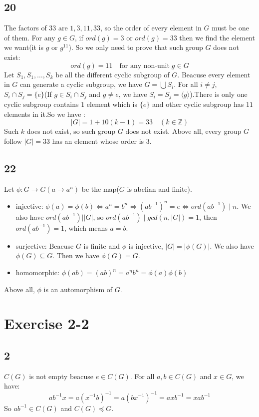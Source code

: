 \documentclass[draft]{article}
\begin{document}
		\subsection*{20}
			The factors of $33$ are $1, 3, 11, 33$, so the order of every element in
			$G$ must be one of them. For any $g \in G$, if $ord(g) = 3$ or $ord(g) =
			33$ then we find the element we want(it is $g$ or $g^{11}$). So we only 
			need to prove that such group $G$ does not exist:
			$$
				ord(g) = 11 \quad \text{for any non-unit} \; g \in G 
			$$
			Let $S_1, S_1, \dots, S_k$ be all the different cyclic subgroup of $G$.
			Beacuse every element in $G$ can generate a cyclic subgroup, we have $G =
			\bigcup S_i$.  For all $i \neq j$, $S_i \cap S_j = \{e\}$(If $g \in S_i \cap S_j$ and $g
			\neq e$, we have $S_i = S_j = \langle g \rangle$).There is only one cyclic
			subgroup contains $1$ element which is $\{e\}$ and other cyclic subgroup has
			$11$ elements in it.So we have :
			$$
			\vert G \vert = 1 + 10(k - 1) = 33 \quad (k \in \mathbb{Z})
			$$
			Such $k$ does not exist, so such group $G$ does not exist.
			Above all, every group $G$ follow $\vert G \vert = 33$ has an element whose
			order is $3$.
		\subsection*{22}
			Let $\phi:G \rightarrow G(a \rightarrow a^n)$ be the map($G$ is abelian
			and finite).
			\begin{itemize}
				\item injective:
					$\phi(a) = \phi(b) \Leftrightarrow a^n = b^n \Leftrightarrow 
						(ab^{-1})^n = e \Leftrightarrow ord(ab^{-1}) \mid n$.
						We also have $ord(ab^{-1}) \mid \vert G \vert$, so $ord(ab^{-1}) \mid
						gcd(n,\vert G \vert) = 1$, then $ord(ab^{-1}) = 1$, which means $a =
						b$.
				\item surjective:
					Beacuse $G$ is finite and $\phi$ is injective, $\vert G \vert = \vert
					\phi(G) \vert$. We also have $\phi(G) \subseteq G$. Then we have
					$\phi(G) = G$.
				\item homomorphic:
					$\phi(ab) = (ab)^n = a^nb^n = \phi(a)\phi(b)$
			\end{itemize}
			Above all, $\phi$ is an automorphism of $G$.
	\section*{Exercise 2-2}
		\subsection*{2}
			$C(G)$ is not empty beacuse $e \in C(G)$. For all $a, b \in C(G)$ and $x \in G$, 
			we have:
			$$
				ab^{-1}x = a(x^{-1}b)^{-1} = a(bx^{-1})^{-1} = axb^{-1} = xab^{-1}
			$$
			So $ab^{-1} \in C(G)$ and $C(G) \preceq G$.
\end{document}

